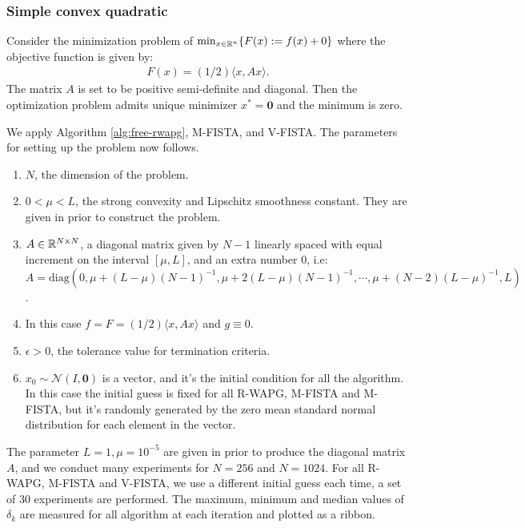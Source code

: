 \documentclass[12pt]{article}
\begin{document}
        \subsubsection{Simple convex quadratic}
            Consider the minimization problem of $\min_{x \in \mathbb R^n} \{F(x):= f(x) + 0\}$ where the objective function is given by: 
            \begin{align*}
                F(x) = (1/2)\langle x, A x\rangle. 
            \end{align*}
            The matrix $A$ is set to be positive semi-definite and diagonal. 
            Then the optimization problem admits unique minimizer $x^* = \mathbf 0$ and the minimum is zero. 
            \par
            We apply Algorithm \ref{alg:free-rwapg}, M-FISTA, and V-FISTA. 
            The parameters for setting up the problem now follows. 
            \begin{enumerate}
                \item $N$, the dimension of the problem. 
                \item $0 < \mu < L$, the strong convexity and Lipschitz smoothness constant. They are given in prior to construct the problem. 
                \item $A \in \mathbb R^{N\times N}$, a diagonal matrix given by $N- 1$ linearly spaced with equal increment on the interval $[\mu, L]$, and an extra number $0$, i.e: $A = \text{diag}(0, \mu + (L-\mu)(N - 1)^{-1}, \mu + 2(L-\mu)(N - 1)^{-1}, \cdots, \mu + (N - 2)(L - \mu)^{-1}, L)$. 
                \item In this case $f = F = (1/2)\langle x, A x\rangle$ and $g \equiv 0$. 
                \item $\epsilon > 0$, the tolerance value for termination criteria. 
                \item $x_0 \sim \mathcal N(I, \mathbf 0)$ is a vector, and it's the initial condition for all the algorithm. In this case the initial guess is fixed for all R-WAPG, M-FISTA and M-FISTA, but it's randomly generated by the zero mean standard normal distribution for each element in the vector. 
            \end{enumerate}
            The parameter $L=1, \mu=10^{-5}$ are given in prior to produce the diagonal matrix $A$, and we conduct many experiments for $N = 256$ and $N = 1024$. 
            For all R-WAPG, M-FISTA and V-FISTA, 
            we use a different initial guess each time, a set of 30 experiments are performed. 
            The maximum, minimum and median values of $\delta_k$ are measured for all algorithm at each iteration and plotted as a ribbon. 
\end{document}
